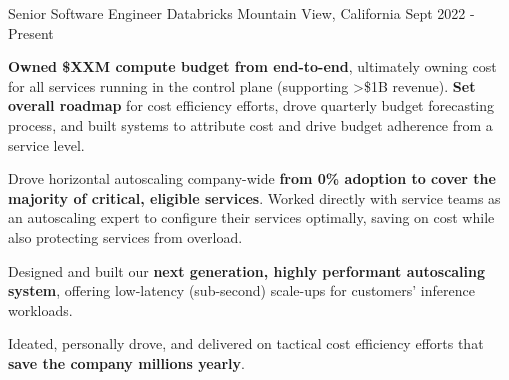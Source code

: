 

\begin{cventries}


\cventry
{Senior Software Engineer}
{\acvHeaderIconSep Databricks}
{Mountain View, California}
{Sept 2022 - Present}
{
	\begin{cvitems}
		\item \textbf{Owned \$XXM compute budget from end-to-end}, ultimately owning cost for all services running in the control plane (supporting >\$1B revenue). \textbf{Set overall roadmap} for cost efficiency efforts, drove quarterly budget forecasting process, and built systems to attribute cost and drive budget adherence from a service level. 
		\item Drove horizontal autoscaling company-wide \textbf{from 0\% adoption to cover the majority of critical, eligible services}. Worked directly with service teams as an autoscaling expert to configure their services optimally, saving on cost while also protecting services from overload. 
		\item Designed and built our \textbf{next generation, highly performant autoscaling system}, offering low-latency (sub-second) scale-ups for customers' inference workloads. 
		\item Ideated, personally drove, and delivered on tactical cost efficiency efforts that \textbf{save the company millions yearly}. 
	\end{cvitems}
}


\end{cventries}
